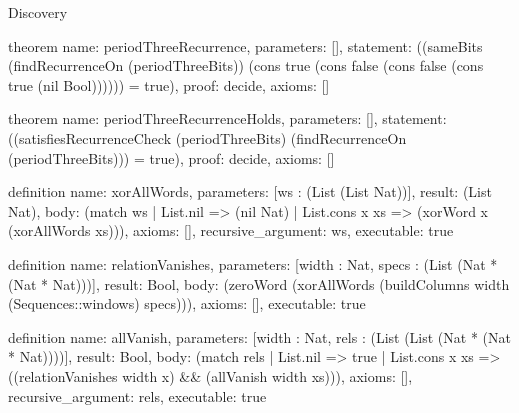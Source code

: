 \begin{lexlean}{Discovery}
\begin{semanticmodule}
theorem{
  name: periodThreeRecurrence,
  parameters: [],
  statement: ((sameBits (findRecurrenceOn (periodThreeBits)) (cons true (cons false (cons false (cons true (nil Bool)))))) = true),
  proof: decide{},
  axioms: []
}

theorem{
  name: periodThreeRecurrenceHolds,
  parameters: [],
  statement: ((satisfiesRecurrenceCheck (periodThreeBits) (findRecurrenceOn (periodThreeBits))) = true),
  proof: decide{},
  axioms: []
}

definition{
  name: xorAllWords,
  parameters: [ws : (List (List Nat))],
  result: (List Nat),
  body: (match ws
    | List.nil => (nil Nat)
    | List.cons x xs => (xorWord x (xorAllWords xs))),
  axioms: [],
  recursive_argument: ws,
  executable: true
}

definition{
  name: relationVanishes,
  parameters: [width : Nat, specs : (List (Nat * (Nat * Nat)))],
  result: Bool,
  body: (zeroWord (xorAllWords (buildColumns width (Sequences::windows) specs))),
  axioms: [],
  executable: true
}

definition{
  name: allVanish,
  parameters: [width : Nat, rels : (List (List (Nat * (Nat * Nat))))],
  result: Bool,
  body: (match rels
    | List.nil => true
    | List.cons x xs => ((relationVanishes width x) && (allVanish width xs))),
  axioms: [],
  recursive_argument: rels,
  executable: true
}


\end{semanticmodule}
\end{lexlean}
